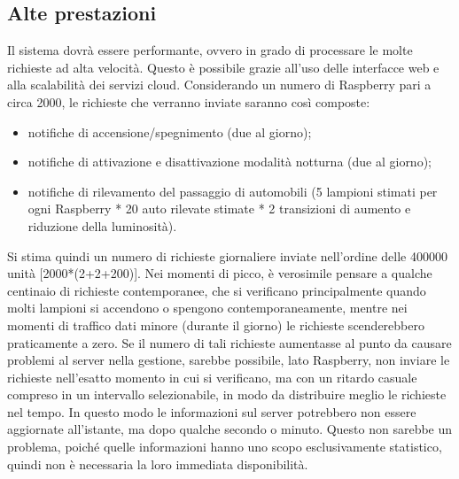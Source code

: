 \subsection{Alte prestazioni}
Il sistema dovrà essere performante, ovvero in grado di processare le molte richieste ad alta velocità. Questo è possibile grazie all'uso delle interfacce web e alla scalabilità dei servizi cloud. Considerando un numero di Raspberry pari a circa 2000, le richieste che verranno inviate saranno così composte:
\begin{itemize}
 \item notifiche di accensione/spegnimento (due al giorno);
 \item notifiche di attivazione e disattivazione modalità notturna (due al giorno);
 \item notifiche di rilevamento del passaggio di automobili (5 lampioni stimati per ogni Raspberry * 20 auto rilevate stimate * 2 transizioni di aumento e riduzione della luminosità).
\end{itemize}
Si stima quindi un numero di richieste giornaliere inviate nell'ordine delle 400000 unità [2000*(2+2+200)].
Nei momenti di picco, è verosimile pensare a qualche centinaio di richieste contemporanee, che si verificano principalmente quando molti lampioni si accendono o spengono contemporaneamente, mentre nei momenti di traffico dati minore (durante il giorno) le richieste scenderebbero praticamente a zero. Se il numero di tali richieste aumentasse al punto da causare problemi al server nella gestione, sarebbe possibile, lato Raspberry, non inviare le richieste nell'esatto momento in cui si verificano, ma con un ritardo casuale compreso in un intervallo selezionabile, in modo da distribuire meglio le richieste nel tempo. In questo modo le informazioni sul server potrebbero non essere aggiornate all’istante, ma dopo qualche secondo o minuto. Questo non sarebbe un problema, poiché quelle informazioni hanno uno scopo esclusivamente statistico, quindi non è necessaria la loro immediata disponibilità.
